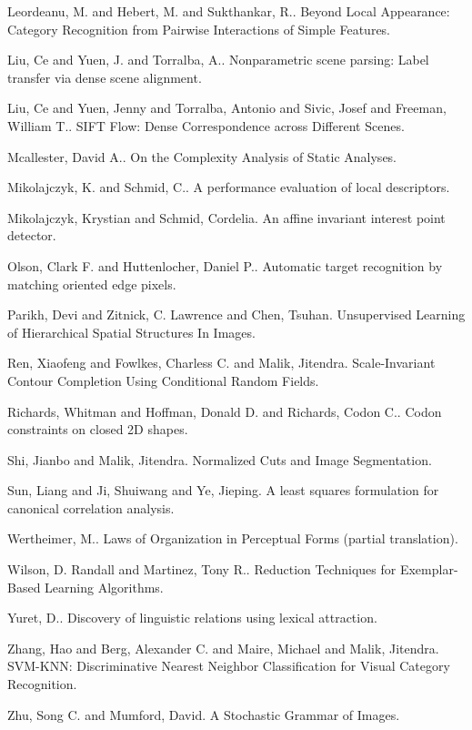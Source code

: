 \documentclass{article}
\begin{document}
\item Leordeanu, M. and Hebert, M. and Sukthankar, R.. Beyond Local Appearance: Category Recognition from Pairwise Interactions of Simple Features. \cite{Leordeanu2007Beyond}
\item Liu, Ce and Yuen, J. and Torralba, A.. Nonparametric scene parsing: Label transfer via dense scene alignment. \cite{Liu2009Nonparametric}
\item Liu, Ce and Yuen, Jenny and Torralba, Antonio and Sivic, Josef and Freeman, William T.. SIFT Flow: Dense Correspondence across Different Scenes. \cite{Liu2008SIFT}
\item Mcallester, David A.. On the Complexity Analysis of Static Analyses. \cite{Mcallester1999Complexity}
\item Mikolajczyk, K. and Schmid, C.. A performance evaluation of local descriptors. \cite{Mikolajczyk2005Performance}
\item Mikolajczyk, Krystian and Schmid, Cordelia. An affine invariant interest point detector. \cite{Mikolajczyk2002Affine}
\item Olson, Clark F. and Huttenlocher, Daniel P.. Automatic target recognition by matching oriented edge pixels. \cite{Olson1997Automatic}
\item Parikh, Devi and Zitnick, C. Lawrence and Chen, Tsuhan. Unsupervised Learning of Hierarchical Spatial Structures In Images. \cite{Parikh09}
\item Ren, Xiaofeng and Fowlkes, Charless C. and Malik, Jitendra. Scale-Invariant Contour Completion Using Conditional Random Fields. \cite{Ren2005ScaleInvariant}
\item Richards, Whitman and Hoffman, Donald D. and Richards, Codon C.. Codon constraints on closed 2D shapes. \cite{Richards1985Codon}
\item Shi, Jianbo and Malik, Jitendra. Normalized Cuts and Image Segmentation. \cite{Shi2000Normalized}
\item Sun, Liang and Ji, Shuiwang and Ye, Jieping. A least squares formulation for canonical correlation analysis. \cite{Sun2008Least}
\item Wertheimer, M.. Laws of Organization in Perceptual Forms (partial translation). \cite{Wertheimer1938Laws}
\item Wilson, D. Randall and Martinez, Tony R.. Reduction Techniques for Exemplar-Based Learning Algorithms. \cite{Wilson2000Reduction}
\item Yuret, D.. Discovery of linguistic relations using lexical attraction. \cite{Yuret:98}
\item Zhang, Hao and Berg, Alexander C. and Maire, Michael and Malik, Jitendra. SVM-KNN: Discriminative Nearest Neighbor Classification for Visual Category Recognition. \cite{Zhang2006SVMKNN}
\item Zhu, Song C. and Mumford, David. A Stochastic Grammar of Images. \cite{zhu-mumford}
\eitem




\end{document}
